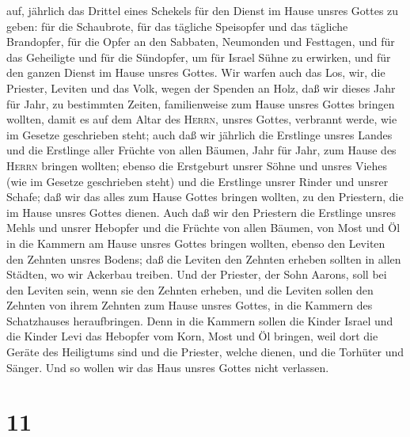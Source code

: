 auf, jährlich das Drittel eines Schekels für den Dienst im Hause unsres
Gottes zu geben: für die Schaubrote,  für das tägliche
Speisopfer und das tägliche Brandopfer, für die Opfer an den Sabbaten,
Neumonden und Festtagen, und für das Geheiligte und für die Sündopfer,
um für Israel Sühne zu erwirken, und für den ganzen Dienst im Hause
unsres Gottes.  Wir warfen auch das Los, wir, die
Priester, Leviten und das Volk, wegen der Spenden an Holz, daß wir
dieses Jahr für Jahr, zu bestimmten Zeiten, familienweise zum Hause
unsres Gottes bringen wollten, damit es auf dem Altar des
\textsc{Herrn}, unsres Gottes, verbrannt werde, wie im Gesetze
geschrieben steht;  auch daß wir jährlich die Erstlinge
unsres Landes und die Erstlinge aller Früchte von allen Bäumen, Jahr für
Jahr, zum Hause des \textsc{Herrn} bringen wollten; 
ebenso die Erstgeburt unsrer Söhne und unsres Viehes (wie im Gesetze
geschrieben steht) und die Erstlinge unsrer Rinder und unsrer Schafe;
daß wir das alles zum Hause Gottes bringen wollten, zu den Priestern,
die im Hause unsres Gottes dienen.  Auch daß wir den
Priestern die Erstlinge unsres Mehls und unsrer Hebopfer und die Früchte
von allen Bäumen, von Most und Öl in die Kammern am Hause unsres Gottes
bringen wollten, ebenso den Leviten den Zehnten unsres Bodens; daß die
Leviten den Zehnten erheben sollten in allen Städten, wo wir Ackerbau
treiben.  Und der Priester, der Sohn Aarons, soll bei den
Leviten sein, wenn sie den Zehnten erheben, und die Leviten sollen den
Zehnten von ihrem Zehnten zum Hause unsres Gottes, in die Kammern des
Schatzhauses heraufbringen.  Denn in die Kammern sollen
die Kinder Israel und die Kinder Levi das Hebopfer vom Korn, Most und Öl
bringen, weil dort die Geräte des Heiligtums sind und die Priester,
welche dienen, und die Torhüter und Sänger. Und so wollen wir das Haus
unsres Gottes nicht verlassen.

\hypertarget{section-10}{%
\section{11}\label{section-10}}

